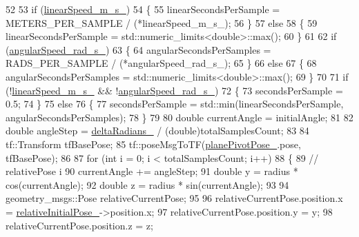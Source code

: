 \begin{DoxyCode}
52 
53         \textcolor{keywordflow}{if} (\hyperlink{classcl__move__group__interface_1_1CbCircularPivotMotion_adf6f6bc7a7a55f5c3dff80475e33c2e3}{linearSpeed\_m\_s\_})
54         \{
55             linearSecondsPerSample = METERS\_PER\_SAMPLE / (*linearSpeed\_m\_s\_);
56         \}
57         \textcolor{keywordflow}{else}
58         \{
59             linearSecondsPerSample = std::numeric\_limits<double>::max();
60         \}
61 
62         \textcolor{keywordflow}{if} (\hyperlink{classcl__move__group__interface_1_1CbCircularPivotMotion_a39fa383804d82285e07fa1c5a37cc587}{angularSpeed\_rad\_s\_})
63         \{
64             angularSecondsPerSamples = RADS\_PER\_SAMPLE / (*angularSpeed\_rad\_s\_);
65         \}
66         \textcolor{keywordflow}{else}
67         \{
68             angularSecondsPerSamples = std::numeric\_limits<double>::max();
69         \}
70 
71         \textcolor{keywordflow}{if} (!\hyperlink{classcl__move__group__interface_1_1CbCircularPivotMotion_adf6f6bc7a7a55f5c3dff80475e33c2e3}{linearSpeed\_m\_s\_} && !\hyperlink{classcl__move__group__interface_1_1CbCircularPivotMotion_a39fa383804d82285e07fa1c5a37cc587}{angularSpeed\_rad\_s\_})
72         \{
73             secondsPerSample = 0.5;
74         \}
75         \textcolor{keywordflow}{else}
76         \{
77             secondsPerSample = std::min(linearSecondsPerSample, angularSecondsPerSamples);
78         \}
79 
80         \textcolor{keywordtype}{double} currentAngle = initialAngle;
81 
82         \textcolor{keywordtype}{double} angleStep = \hyperlink{classcl__move__group__interface_1_1CbCircularPivotMotion_afade33f1182615c64ea972075bfd2b95}{deltaRadians\_} / (double)totalSamplesCount;
83 
84         tf::Transform tfBasePose;
85         tf::poseMsgToTF(\hyperlink{classcl__move__group__interface_1_1CbCircularPivotMotion_a0994efbe93b9f9a61fcf3703c360cda2}{planePivotPose\_}.pose, tfBasePose);
86 
87         \textcolor{keywordflow}{for} (\textcolor{keywordtype}{int} i = 0; i < totalSamplesCount; i++)
88         \{
89             \textcolor{comment}{// relativePose i}
90             currentAngle += angleStep;
91             \textcolor{keywordtype}{double} y = radius * cos(currentAngle);
92             \textcolor{keywordtype}{double} z = radius * sin(currentAngle);
93 
94             geometry\_msgs::Pose relativeCurrentPose;
95 
96             relativeCurrentPose.position.x = \hyperlink{classcl__move__group__interface_1_1CbCircularPivotMotion_a1b2cc65d2f27a4dec54c20f1f00d4bb8}{relativeInitialPose\_}->position.x;
97             relativeCurrentPose.position.y = y;
98             relativeCurrentPose.position.z = z;

\end{DoxyCode}
